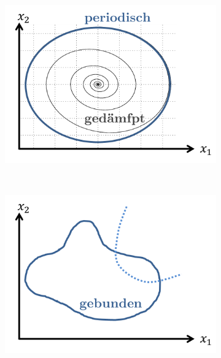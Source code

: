 \documentclass[12pt]{article}
\begin{document}
\begin{figure}[h] 
		\begin{subfigure}[h]{0.5 \textwidth}
		\centering
		\includegraphics[width=\textwidth]{Folie65.png}
		\centering
	\end{subfigure}
	~
\begin{subfigure}[h]{0.5\textwidth}
		\centering
		\includegraphics[width=\textwidth]{Folie66.png}
		\centering
	\end{subfigure}
	\caption{} \label{Phasenraumtrajektorie}
\end{figure}	
\end{document}

